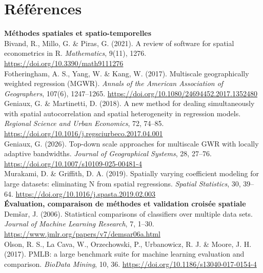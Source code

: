 \documentclass[11pt,a4paper]{article}
\begin{document}
\section*{Références}

{\small
\RaggedRight
\setlength{\parindent}{0pt}
\setlength{\parskip}{0.12cm}

\textbf{Méthodes spatiales et spatio-temporelles}\\[0.15cm]

Bivand, R., Millo, G. \& Piras, G. (2021). A review of software for spatial econometrics in R. \textit{Mathematics}, 9(11), 1276. \url{https://doi.org/10.3390/math9111276}\\[0.2cm]

Fotheringham, A. S., Yang, W. \& Kang, W. (2017). Multiscale geographically weighted regression (MGWR). \textit{Annals of the American Association of Geographers}, 107(6), 1247--1265. \url{https://doi.org/10.1080/24694452.2017.1352480}\\[0.2cm]

Geniaux, G. \& Martinetti, D. (2018). A new method for dealing simultaneously with spatial autocorrelation and spatial heterogeneity in regression models. \textit{Regional Science and Urban Economics}, 72, 74--85. \url{https://doi.org/10.1016/j.regsciurbeco.2017.04.001}\\[0.2cm]

Geniaux, G. (2026). Top-down scale approaches for multiscale GWR with locally adaptive bandwidths. \textit{Journal of Geographical Systems}, 28, 27--76. \url{https://doi.org/10.1007/s10109-025-00481-4}\\[0.2cm]

Murakami, D. \& Griffith, D. A. (2019). Spatially varying coefficient modeling for large datasets: eliminating N from spatial regressions. \textit{Spatial Statistics}, 30, 39--64. \url{https://doi.org/10.1016/j.spasta.2019.02.003}\\[0.4cm]

\textbf{Évaluation, comparaison de méthodes et validation croisée spatiale}\\[0.15cm]

Demšar, J. (2006). Statistical comparisons of classifiers over multiple data sets. \textit{Journal of Machine Learning Research}, 7, 1--30. \url{https://www.jmlr.org/papers/v7/demsar06a.html}\\[0.2cm]

Olson, R. S., La Cava, W., Orzechowski, P., Urbanowicz, R. J. \& Moore, J. H. (2017). PMLB: a large benchmark suite for machine learning evaluation and comparison. \textit{BioData Mining}, 10, 36. \url{https://doi.org/10.1186/s13040-017-0154-4}\\[0.2cm]

}
\end{document}
